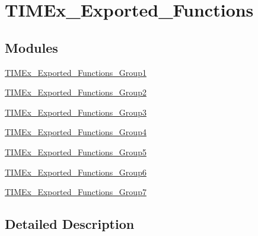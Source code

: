 \hypertarget{group___t_i_m_ex___exported___functions}{}\section{T\+I\+M\+Ex\+\_\+\+Exported\+\_\+\+Functions}
\label{group___t_i_m_ex___exported___functions}
\subsection*{Modules}
\begin{DoxyCompactItemize}
\item 
\mbox{\hyperlink{group___t_i_m_ex___exported___functions___group1}{T\+I\+M\+Ex\+\_\+\+Exported\+\_\+\+Functions\+\_\+\+Group1}}
\item 
\mbox{\hyperlink{group___t_i_m_ex___exported___functions___group2}{T\+I\+M\+Ex\+\_\+\+Exported\+\_\+\+Functions\+\_\+\+Group2}}
\item 
\mbox{\hyperlink{group___t_i_m_ex___exported___functions___group3}{T\+I\+M\+Ex\+\_\+\+Exported\+\_\+\+Functions\+\_\+\+Group3}}
\item 
\mbox{\hyperlink{group___t_i_m_ex___exported___functions___group4}{T\+I\+M\+Ex\+\_\+\+Exported\+\_\+\+Functions\+\_\+\+Group4}}
\item 
\mbox{\hyperlink{group___t_i_m_ex___exported___functions___group5}{T\+I\+M\+Ex\+\_\+\+Exported\+\_\+\+Functions\+\_\+\+Group5}}
\item 
\mbox{\hyperlink{group___t_i_m_ex___exported___functions___group6}{T\+I\+M\+Ex\+\_\+\+Exported\+\_\+\+Functions\+\_\+\+Group6}}
\item 
\mbox{\hyperlink{group___t_i_m_ex___exported___functions___group7}{T\+I\+M\+Ex\+\_\+\+Exported\+\_\+\+Functions\+\_\+\+Group7}}
\end{DoxyCompactItemize}


\subsection{Detailed Description}
